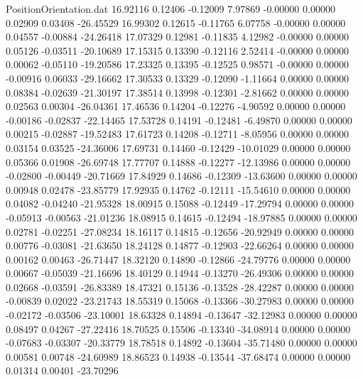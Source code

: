 \begin{filecontents}{PositionOrientation.dat}
  16.92116    0.12406   -0.12009     7.97869   -0.00000    0.00000    0.02909    0.03408  -26.45529
  16.99302    0.12615   -0.11765     6.07758   -0.00000    0.00000    0.04557   -0.00884  -24.26418
  17.07329    0.12981   -0.11835     4.12982   -0.00000    0.00000    0.05126   -0.03511  -20.10689
  17.15315    0.13390   -0.12116     2.52414   -0.00000    0.00000    0.00062   -0.05110  -19.20586
  17.23325    0.13395   -0.12525     0.98571   -0.00000    0.00000   -0.00916    0.06033  -29.16662
  17.30533    0.13329   -0.12090    -1.11664    0.00000    0.00000    0.08384   -0.02639  -21.30197
  17.38514    0.13998   -0.12301    -2.81662    0.00000    0.00000    0.02563    0.00304  -26.04361
  17.46536    0.14204   -0.12276    -4.90592    0.00000    0.00000   -0.00186   -0.02837  -22.14465
  17.53728    0.14191   -0.12481    -6.49870    0.00000    0.00000    0.00215   -0.02887  -19.52483
  17.61723    0.14208   -0.12711    -8.05956    0.00000    0.00000    0.03154    0.03525  -24.36006
  17.69731    0.14460   -0.12429   -10.01029    0.00000    0.00000    0.05366    0.01908  -26.69748
  17.77707    0.14888   -0.12277   -12.13986    0.00000    0.00000   -0.02800   -0.00449  -20.71669
  17.84929    0.14686   -0.12309   -13.63600    0.00000    0.00000    0.00948    0.02478  -23.85779
  17.92935    0.14762   -0.12111   -15.54610    0.00000    0.00000    0.04082   -0.04240  -21.95328
  18.00915    0.15088   -0.12449   -17.29794    0.00000    0.00000   -0.05913   -0.00563  -21.01236
  18.08915    0.14615   -0.12494   -18.97885    0.00000    0.00000    0.02781   -0.02251  -27.08234
  18.16117    0.14815   -0.12656   -20.92949    0.00000    0.00000    0.00776   -0.03081  -21.63650
  18.24128    0.14877   -0.12903   -22.66264    0.00000    0.00000    0.00162    0.00463  -26.71447
  18.32120    0.14890   -0.12866   -24.79776    0.00000    0.00000    0.00667   -0.05039  -21.16696
  18.40129    0.14944   -0.13270   -26.49306    0.00000    0.00000    0.02668   -0.03591  -26.83389
  18.47321    0.15136   -0.13528   -28.42287    0.00000    0.00000   -0.00839    0.02022  -23.21743
  18.55319    0.15068   -0.13366   -30.27983    0.00000    0.00000   -0.02172   -0.03506  -23.10001
  18.63328    0.14894   -0.13647   -32.12983    0.00000    0.00000    0.08497    0.04267  -27.22416
  18.70525    0.15506   -0.13340   -34.08914    0.00000    0.00000   -0.07683   -0.03307  -20.33779
  18.78518    0.14892   -0.13604   -35.71480    0.00000    0.00000    0.00581    0.00748  -24.60989
  18.86523    0.14938   -0.13544   -37.68474    0.00000    0.00000    0.01314    0.00401  -23.70296

\end{filecontents}
